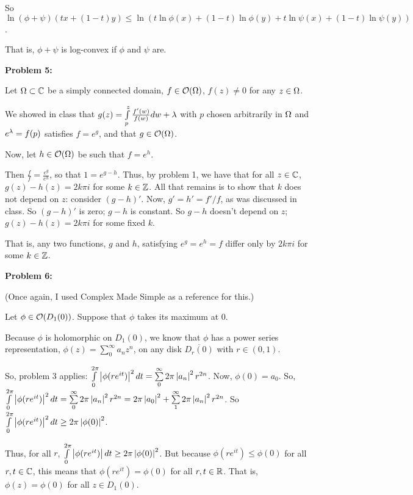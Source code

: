 \documentclass[a4paper,12pt]{article}
\begin{document}
So $\ln(\phi + \psi)(tx+(1-t)y) \leq \ln(t\ln\phi(x) + (1-t)\ln\phi(y) +t\ln\psi(x) + (1-t)\ln\psi(y))$.

That is, $\phi + \psi$ is log-convex if $\phi$ and $\psi$ are.

\shunt

{\bf Problem 5:}

Let $\Omega \subset \mathbb{C}$ be a simply connected domain, $f \in \mathcal{O}(\Omega)$, $f(z) \neq 0$ for any $z \in \Omega$.

We showed in class that $g(z) = \int\limits_p^z \frac{f'(w)}{f(w)} dw + \lambda$ with $p$ chosen arbitrarily in $\Omega$ and $e^\lambda = f(p)$ satisfies $f=e^g$, and that $g \in \mathcal{O}(\Omega)$. 

Now, let $h \in \mathcal{O}(\Omega)$ be such that $f=e^h$.

Then $\frac{f}{f} = \frac{e^g}{e^h}$, so that $1 = e^{g-h}$. Thus, by problem 1, we have that for all $z \in \mathbb{C}$, $g(z)-h(z) = 2k \pi  i$ for some $k \in \mathbb{Z}$. All that remains is to show that $k$ does not depend on $z$: consider $(g-h)'$. Now, $g'=h' = f'/f$, as was discussed in class. So $(g-h)'$ is zero; $g-h$ is constant. So $g-h$ doesn't depend on $z$; $g(z)-h(z) =2k\pi i$ for some fixed $k$.

That is, any two functions, $g$ and $h$, satisfying $e^g=e^h=f$ differ only by $2k\pi i $ for some $k \in \mathbb{Z}$.

\shunt

{\bf Problem 6:}

(Once again, I used Complex Made Simple as a reference for this.)

Let $\phi \in \mathcal{O}(D_1(0))$. Suppose that $\phi$ takes its maximum at $0$.

Because $\phi$ is holomorphic on $D_1(0)$, we know that $\phi$ has a power series representation, $\phi(z)=\sum\limits_0^\infty a_nz^n $, on any disk $\overline{D_r(0)}$ with $r \in (0,1)$.

So, problem 3 applies: $\int\limits_0^{2\pi} \left\lvert \phi(re^{it}) \right\rvert^2dt = \sum\limits_0^\infty 2\pi \left\lvert a_n \right\rvert^2 r^{2n}$. Now, $\phi(0) = a_0$. So, $\int\limits_0^{2\pi} \left\lvert \phi(re^{it}) \right\rvert^2dt = \sum\limits_0^\infty 2\pi \left\lvert a_n \right\rvert^2 r^{2n} = 2\pi \left\lvert a_0 \right\rvert^2 + \sum\limits_1^\infty 2\pi \left\lvert a_n \right\rvert^2 r^{2n}$. So $\int\limits_0^{2\pi} \left\lvert \phi(re^{it}) \right\rvert^2dt \geq 2\pi\left\lvert \phi(0) \right\rvert^2$.

Thus, for all $r$, $\int\limits_0^{2\pi} \left\lvert \phi(re^{it}) \right\rvert dt \geq 2\pi \left\lvert \phi(0) \right\rvert^2$. But because $\phi(re^{it}) \leq \phi(0)$ for all $r,t \in \mathbb{C}$, this means that $\phi(re^{it}) = \phi(0)$ for all $r,t \in \mathbb{R}$. That is, $\phi(z) = \phi(0)$ for all $z \in D_1(0)$.
\end{document}

